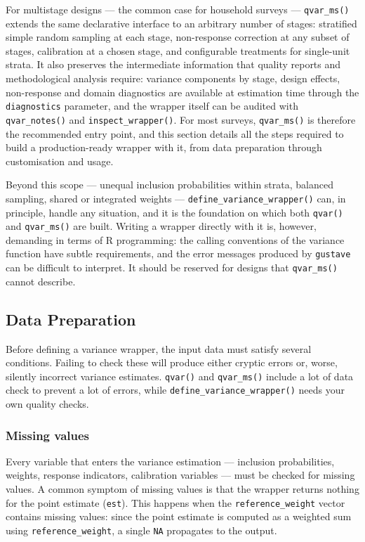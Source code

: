 \documentclass[
]{article}
\begin{document}
For multistage designs --- the common case for household surveys ---
\texttt{qvar\_ms()} extends the same declarative interface to an
arbitrary number of stages: stratified simple random sampling at each
stage, non-response correction at any subset of stages, calibration at a
chosen stage, and configurable treatments for single-unit strata. It
also preserves the intermediate information that quality reports and
methodological analysis require: variance components by stage, design
effects, non-response and domain diagnostics are available at estimation
time through the \texttt{diagnostics} parameter, and the wrapper itself
can be audited with \texttt{qvar\_notes()} and
\texttt{inspect\_wrapper()}. For most surveys, \texttt{qvar\_ms()} is
therefore the recommended entry point, and this section details all the
steps required to build a production-ready wrapper with it, from data
preparation through customisation and usage.

Beyond this scope --- unequal inclusion probabilities within strata,
balanced sampling, shared or integrated weights ---
\texttt{define\_variance\_wrapper()} can, in principle, handle any
situation, and it is the foundation on which both \texttt{qvar()} and
\texttt{qvar\_ms()} are built. Writing a wrapper directly with it is,
however, demanding in terms of R programming: the calling conventions of
the variance function have subtle requirements, and the error messages
produced by \texttt{gustave} can be difficult to interpret. It should be
reserved for designs that \texttt{qvar\_ms()} cannot describe.

\subsection{Data Preparation}\label{data-preparation}

Before defining a variance wrapper, the input data must satisfy several
conditions. Failing to check these will produce either cryptic errors
or, worse, silently incorrect variance estimates. \texttt{qvar()} and
\texttt{qvar\_ms()} include a lot of data check to prevent a lot of
errors, while \texttt{define\_variance\_wrapper()} needs your own
quality checks.

\subsubsection{Missing values}\label{missing-values}

Every variable that enters the variance estimation --- inclusion
probabilities, weights, response indicators, calibration variables ---
must be checked for missing values. A common symptom of missing values
is that the wrapper returns nothing for the point estimate
(\texttt{est}). This happens when the \texttt{reference\_weight} vector
contains missing values: since the point estimate is computed as a
weighted sum using \texttt{reference\_weight}, a single \texttt{NA}
propagates to the output.
\end{document}
